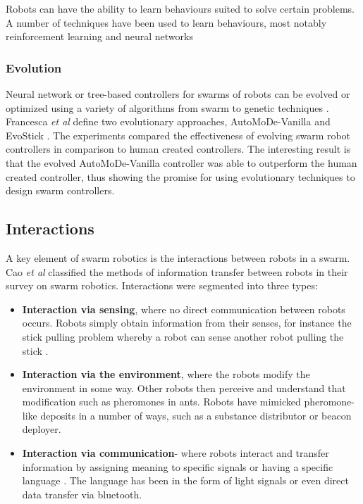 Robots can have the ability to learn behaviours suited to solve certain problems. A number of techniques have been used to learn behaviours, most notably reinforcement learning and neural networks \cite{samejima1999adaptive, sun1999multi}

\subsubsection{Evolution}
Neural network or tree-based controllers for swarms of robots can be evolved or optimized using a variety of algorithms from swarm to genetic techniques \cite{baldassarre2003evolving, tuci2014evolutionary}. Francesca \textit{et al} define two evolutionary approaches, AutoMoDe-Vanilla and EvoStick \cite{francesca2014automode,francesca2014experiment}. The experiments compared the effectiveness of evolving swarm robot controllers in comparison to human created controllers. The interesting result is that the evolved AutoMoDe-Vanilla controller was able to outperform the human created controller, thus showing the promise for using evolutionary techniques to design swarm controllers.

\subsection{Interactions}
A key element of swarm robotics is the interactions between robots in a swarm. Cao \textit{et al} \cite{cao1997cooperative} classified the methods of information transfer between robots in their  survey on swarm robotics. Interactions were segmented into three types:
\begin{itemize}
	\item \textbf{Interaction via sensing}, where no direct communication between robots occurs. Robots simply obtain information from their senses, for instance the stick pulling problem whereby a robot can sense another robot pulling the stick \cite{ijspeert2001collaboration}. 
	\item \textbf{Interaction via the environment}, where the robots modify the environment in some way. Other robots then perceive and understand that modification such as pheromones in ants. Robots have mimicked pheromone-like deposits in a number of ways, such as a substance distributor \cite{fujisawa2014designing} or beacon deployer\cite{barth2003dynamic}.
	\item \textbf{Interaction via communication}- where robots interact and transfer information by assigning meaning to specific signals or having a specific language \cite{hoff2010two}. The language has been in the form of light signals or even direct data transfer via bluetooth.  
\end{itemize}

